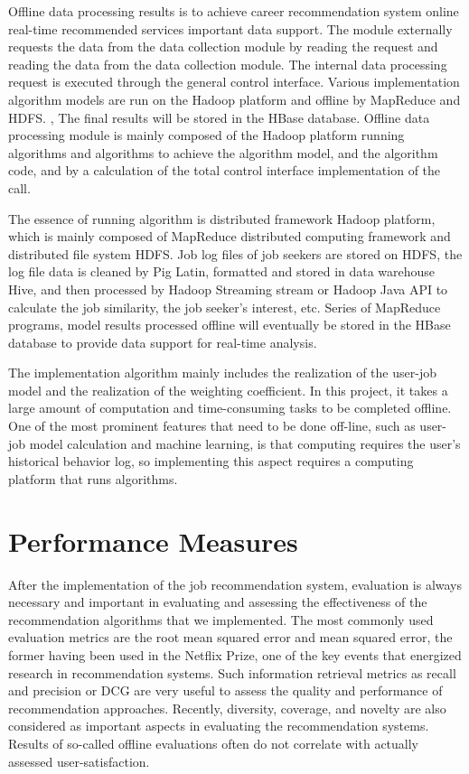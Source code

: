 \documentclass[sigconf]{acmart}
\begin{document}
\par Offline data processing results is to achieve career recommendation system online real-time recommended services important data support. The module externally requests the data from the data collection module by reading the request and reading the data from the data collection module. The internal data processing request is executed through the general control interface.\cite{CBF2017} Various implementation algorithm models are run on the Hadoop platform and offline by MapReduce and HDFS. , The final results will be stored in the HBase database. Offline data processing module is mainly composed of the Hadoop platform running algorithms and algorithms to achieve the algorithm model, and the algorithm code, and by a calculation of the total control interface implementation of the call.

\par The essence of running algorithm is distributed framework Hadoop platform, which is mainly composed of MapReduce distributed computing framework and distributed file system HDFS. Job log files of job seekers are stored on HDFS, the log file data is cleaned by Pig Latin, formatted and stored in data warehouse Hive, and then processed by Hadoop Streaming stream or Hadoop Java API to calculate the job similarity, the job seeker's interest, etc. Series of MapReduce programs, model results processed offline will eventually be stored in the HBase database to provide data support for real-time analysis.

\par The implementation algorithm mainly includes the realization of the user-job model and the realization of the weighting coefficient. In this project, it takes a large amount of computation and time-consuming tasks to be completed offline. One of the most prominent features that need to be done off-line, such as user-job model calculation and machine learning, is that computing requires the user's historical behavior log, so implementing this aspect requires a computing platform that runs algorithms.




\section{Performance Measures}
After the implementation of the job recommendation system, evaluation is always necessary and important in evaluating and assessing the effectiveness of the recommendation algorithms that we implemented.\cite{Jain2016} The most commonly used evaluation metrics are the root mean squared error and mean squared error, the former having been used in the Netflix Prize, one of the key events that energized research in recommendation systems. Such information retrieval metrics as recall and precision or DCG are very useful to assess the quality and performance of recommendation approaches.\cite{Jain2016} Recently, diversity, coverage, and novelty are also considered as important aspects in evaluating the recommendation systems. Results of so-called offline evaluations often do not correlate with actually assessed user-satisfaction.
\end{document}
